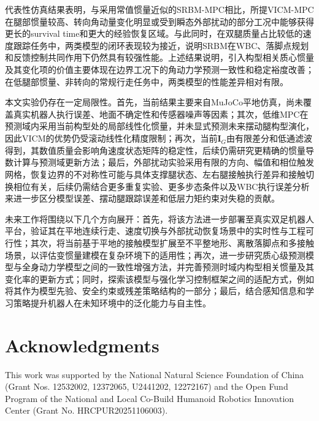 ﻿\documentclass[preprint,12pt]{elsarticle}
\begin{document}
代表性仿真结果表明，与采用常值惯量近似的SRBM-MPC相比，所提VICM-MPC在腿部惯量较高、转向角动量变化明显或受到瞬态外部扰动的部分工况中能够获得更长的survival time和更大的经验恢复区域。与此同时，在双腿质量占比较低的速度跟踪任务中，两类模型的闭环表现较为接近，说明SRBM在WBC、落脚点规划和反馈控制共同作用下仍然具有较强性能。上述结果说明，引入构型相关质心惯量及其变化项的价值主要体现在边界工况下的角动力学预测一致性和稳定裕度改善；在低腿部惯量、非转向的常规行走任务中，两类模型的性能差异相对有限。

本文实验仍存在一定局限性。首先，当前结果主要来自MuJoCo平地仿真，尚未覆盖真实机器人执行误差、地面不确定性和传感器噪声等因素；其次，低维MPC在预测域内采用当前构型处的局部线性化惯量，并未显式预测未来摆动腿构型演化，因此VICM的优势仍受滚动线性化精度限制；再次，当前$\dot{\bm I}_G$由有限差分和低通滤波得到，其数值质量会影响角速度状态矩阵的稳定性，后续仍需研究更精确的惯量导数计算与预测域更新方法；最后，外部扰动实验采用有限的方向、幅值和相位触发网格，恢复边界的不对称性可能与具体支撑腿状态、左右腿接触执行差异和接触切换相位有关，后续仍需结合更多重复实验、更多步态条件以及WBC执行误差分析来进一步区分模型误差、摆动腿跟踪误差和低层力矩约束对失稳的贡献。

未来工作将围绕以下几个方向展开：首先，将该方法进一步部署至真实双足机器人平台，验证其在平地连续行走、速度切换与外部扰动恢复场景中的实时性与工程可行性；其次，将当前基于平地的接触模型扩展至不平整地形、离散落脚点和多接触场景，以评估变惯量建模在复杂环境下的适用性；再次，进一步研究质心级预测模型与全身动力学模型之间的一致性增强方法，并完善预测时域内构型相关惯量及其变化率的更新方式；同时，探索该模型与强化学习控制框架之间的适配方式，例如将其作为模型先验、安全约束或残差策略结构的一部分；最后，结合感知信息和学习策略提升机器人在未知环境中的泛化能力与自主性。

\section*{Acknowledgments}
This work was supported by the National Natural Science Foundation of China (Grant Nos. 12532002, 12372065, U2441202, 12272167) and the Open Fund Program of the National and Local Co-Build Humanoid Robotics Innovation Center (Grant No. HRCPUR20251106003).
\end{document}
